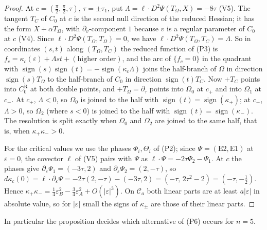 \begin{proof}
At $c=(\frac\pi2,\frac\pi2,\tau)$, $\tau=\pm\tau_1$, put $\Lambda=\ell\cdot D^2\Psi(T_\Omega,X)=-8\tau$ (V5). The tangent $T_C$ of $C_0$ at $c$ is the
second null direction of the reduced Hessian; it has the form $X+\alpha T_\Omega$, with $\partial_v$-component $1$ because $v$ is a
regular parameter of $C_0$ at $c$ (V4). Since $\ell\cdot D^2\Psi(T_\Omega,T_\Omega)=0$, we have $\ell\cdot D^2\Psi(T_\Omega,T_C)=\Lambda$. So in
coordinates $(s,t)$ along $(T_\Omega,T_C)$ the reduced function of (P3) is $f_c=\kappa_c(\varepsilon)+\Lambda st+(\text{higher order})$, and the arc of
$\{f_c=0\}$ in the quadrant with $\operatorname{sign}(s)\operatorname{sign}(t)=-\operatorname{sign}(\kappa_c\Lambda)$ joins the half-branch of $\Omega$ in direction
$\operatorname{sign}(s)T_\Omega$ to the half-branch of $C_0$ in direction $\operatorname{sign}(t)T_C$. Now $+T_C$ points into $C_0^{\mathrm R}$ at both double
points, and $+T_\Omega=\partial_\tau$ points into $\Omega_0$ at $c_+$ and into $\Omega_1$ at $c_-$. At $c_+$, $\Lambda<0$, so $\Omega_0$ is joined to the
half with $\operatorname{sign}(t)=\operatorname{sign}(\kappa_+)$; at $c_-$, $\Lambda>0$, so $\Omega_2$ (where $s<0$) is joined to the half with
$\operatorname{sign}(t)=\operatorname{sign}(\kappa_-)$. The resolution is split exactly when $\Omega_0$ and $\Omega_2$ are joined to the same half, that
is, when $\kappa_+\kappa_->0$.

For the critical values we use the phases $\Phi_i,\Theta_i$ of (P2); since $\Psi=(\mathrm{E2},\mathrm{E1})$ at $\varepsilon=0$, the
covector $\ell$ of (V5) pairs with $\Psi$ as $\ell\cdot\Psi=-2\tau\Psi_2-\Psi_1$. At $c$ the phases give $\partial_\varepsilon\Psi_1=(-3\tau,2)$ and $\partial_\varepsilon\Psi_2=(2,-\tau)$, so
$d\kappa_c(0)=\ell\cdot\partial_\varepsilon\Psi=-2\tau(2,-\tau)-(-3\tau,2)=(-\tau,\,2\tau^2-2)=(-\tau,-\tfrac12)$. Hence
$\kappa_+\kappa_-=\frac14\varepsilon_B^2-\frac34\varepsilon_A^2+O(|\varepsilon|^3)$. On $\mathcal C_a$ both linear parts are at least $a|\varepsilon|$ in absolute
value, so for $|\varepsilon|$ small the signs of $\kappa_\pm$ are those of their linear parts.
\end{proof}

In particular the proposition decides which alternative of (P6) occurs for $n=5$.

